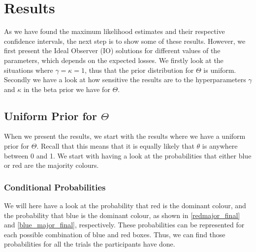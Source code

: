 \chapter{Results}

As we have found the maximum likelihood estimates and their respective confidence intervals, the next step is to show some of these results. However, we first present the Ideal Observer (IO) solutions for different values of the parameters, which depends on the expected losses. We firstly look at the situations where $\gamma=\kappa=1$, thus that the prior distribution for $\Theta$ is uniform. Secondly we have a look at how sensitive the results are to the hyperparameters $\gamma$ and $\kappa$ in the beta prior we have for $\Theta$.

\section{Uniform Prior for $\Theta$}
When we present the results, we start with the results where we have a uniform prior for $\Theta$. Recall that this means that it is equally likely that $\theta$ is anywhere between 0 and 1. We start with having a look at the probabilities that either blue or red are the majority colours. 

\subsection{Conditional Probabilities}
We will here have a look at the probability that red is the dominant colour, and the probability that blue is the dominant colour, as shown in \eqref{redmajor_final} and \eqref{blue_major_final}, respectively. These probabilities can be represented for each possible combination of blue and red boxes. Thus, we can find those probabilities for all the trials the participants have done. 


